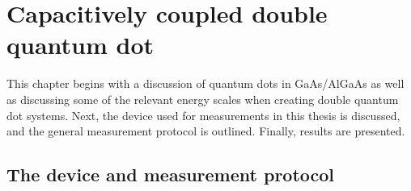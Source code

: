 
\chapter{Capacitively coupled double quantum dot}
\label{ch:Methods}

This chapter begins with a discussion of quantum dots in GaAs/AlGaAs as well as discussing some of the relevant energy scales when creating double quantum dot systems. Next, the device used for measurements in this thesis is discussed, and the general measurement protocol is outlined. Finally, results are presented. 



\section{The device and measurement protocol}
\label{sec:device}

